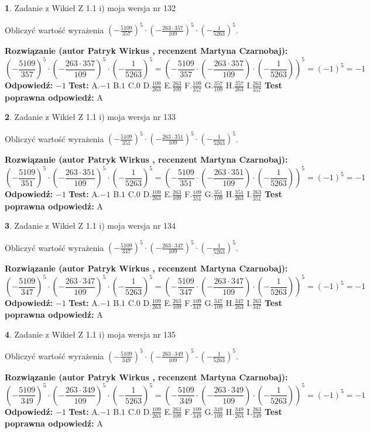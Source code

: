 \documentclass[12pt, a4paper]{article}
\theoremstyle{definition} %
\newtheorem{zad}{}
\newcommand{\zadStart}[1]{\begin{zad}#1\newline}
\newcommand{\zadStop}{\end{zad}}
\newcommand{\rozwStart}[2]{\noindent \textbf{Rozwiązanie (autor #1 , recenzent #2): }\newline}
\newcommand{\rozwStop}{\newline}
\newcommand{\odpStart}{\noindent \textbf{Odpowiedź:}\newline}
\newcommand{\odpStop}{\newline}
\newcommand{\testStart}{\noindent \textbf{Test:}\newline}
\newcommand{\testStop}{\newline}
\newcommand{\kluczStart}{\noindent \textbf{Test poprawna odpowiedź:}\newline}
\newcommand{\kluczStop}{\newline}
\begin{document}
\zadStart{Zadanie z Wikieł Z 1.1 i) moja wersja nr 132}

Obliczyć wartość wyrażenia $(-\frac{5109}{357})^{5} \cdot (-\frac{263 \cdot 357}{109})^{5} \cdot (-\frac{1}{5263})^{5}$.
\zadStop
\rozwStart{Patryk Wirkus}{Martyna Czarnobaj}
$$(-\frac{5109}{357})^{5} \cdot (-\frac{263 \cdot 357}{109})^{5} \cdot (-\frac{1}{5263})^{5} = (-\frac{5109}{357} \cdot (-\frac{263 \cdot 357}{109}) \cdot (-\frac{1}{5263}))^{5} = (-1)^{5} = -1$$
\rozwStop
\odpStart
$-1$
\odpStop
\testStart
A.$-1$ B.$1$ C.$0$ D.$\frac{109}{263}$ E.$\frac{263}{109}$
F.$\frac{109}{357}$ G.$\frac{357}{109}$
H.$\frac{357}{263}$
I.$\frac{263}{357}$
\testStop
\kluczStart
A
\kluczStop



\zadStart{Zadanie z Wikieł Z 1.1 i) moja wersja nr 133}

Obliczyć wartość wyrażenia $(-\frac{5109}{351})^{5} \cdot (-\frac{263 \cdot 351}{109})^{5} \cdot (-\frac{1}{5263})^{5}$.
\zadStop
\rozwStart{Patryk Wirkus}{Martyna Czarnobaj}
$$(-\frac{5109}{351})^{5} \cdot (-\frac{263 \cdot 351}{109})^{5} \cdot (-\frac{1}{5263})^{5} = (-\frac{5109}{351} \cdot (-\frac{263 \cdot 351}{109}) \cdot (-\frac{1}{5263}))^{5} = (-1)^{5} = -1$$
\rozwStop
\odpStart
$-1$
\odpStop
\testStart
A.$-1$ B.$1$ C.$0$ D.$\frac{109}{263}$ E.$\frac{263}{109}$
F.$\frac{109}{351}$ G.$\frac{351}{109}$
H.$\frac{351}{263}$
I.$\frac{263}{351}$
\testStop
\kluczStart
A
\kluczStop



\zadStart{Zadanie z Wikieł Z 1.1 i) moja wersja nr 134}

Obliczyć wartość wyrażenia $(-\frac{5109}{347})^{5} \cdot (-\frac{263 \cdot 347}{109})^{5} \cdot (-\frac{1}{5263})^{5}$.
\zadStop
\rozwStart{Patryk Wirkus}{Martyna Czarnobaj}
$$(-\frac{5109}{347})^{5} \cdot (-\frac{263 \cdot 347}{109})^{5} \cdot (-\frac{1}{5263})^{5} = (-\frac{5109}{347} \cdot (-\frac{263 \cdot 347}{109}) \cdot (-\frac{1}{5263}))^{5} = (-1)^{5} = -1$$
\rozwStop
\odpStart
$-1$
\odpStop
\testStart
A.$-1$ B.$1$ C.$0$ D.$\frac{109}{263}$ E.$\frac{263}{109}$
F.$\frac{109}{347}$ G.$\frac{347}{109}$
H.$\frac{347}{263}$
I.$\frac{263}{347}$
\testStop
\kluczStart
A
\kluczStop



\zadStart{Zadanie z Wikieł Z 1.1 i) moja wersja nr 135}

Obliczyć wartość wyrażenia $(-\frac{5109}{349})^{5} \cdot (-\frac{263 \cdot 349}{109})^{5} \cdot (-\frac{1}{5263})^{5}$.
\zadStop
\rozwStart{Patryk Wirkus}{Martyna Czarnobaj}
$$(-\frac{5109}{349})^{5} \cdot (-\frac{263 \cdot 349}{109})^{5} \cdot (-\frac{1}{5263})^{5} = (-\frac{5109}{349} \cdot (-\frac{263 \cdot 349}{109}) \cdot (-\frac{1}{5263}))^{5} = (-1)^{5} = -1$$
\rozwStop
\odpStart
$-1$
\odpStop
\testStart
A.$-1$ B.$1$ C.$0$ D.$\frac{109}{263}$ E.$\frac{263}{109}$
F.$\frac{109}{349}$ G.$\frac{349}{109}$
H.$\frac{349}{263}$
I.$\frac{263}{349}$
\testStop
\kluczStart
A
\kluczStop
\end{document}
